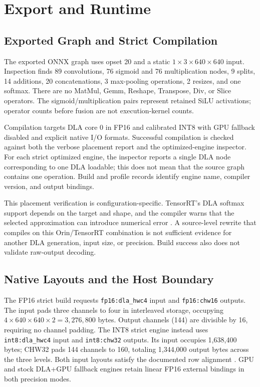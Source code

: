 \section{Export and Runtime}
\label{sec:deployment}
\subsection{Exported Graph and Strict Compilation}
The exported ONNX graph uses opset 20 and a static $1\times3\times640\times640$
input. Inspection finds 89 convolutions, 76 sigmoid and 76 multiplication nodes,
9 splits, 14 additions, 20 concatenations, 3 max-pooling operations, 2 resizes,
and one softmax. There are no MatMul, Gemm, Reshape, Transpose, Div, or Slice
operators. The sigmoid/multiplication pairs represent retained SiLU activations;
operator counts before fusion are not execution-kernel counts.

Compilation targets DLA core 0 in FP16 and calibrated INT8 with GPU fallback
disabled and explicit native I/O formats. Successful compilation is checked against both the verbose
placement report and the optimized-engine inspector. For each strict optimized engine,
the inspector reports a single DLA node corresponding to one DLA loadable; this
does not mean that the source graph contains one operation. Build and profile
records identify engine name, compiler version, and output bindings.

This placement verification is configuration-specific. TensorRT's DLA softmax support depends on
the target and shape, and the compiler warns that the selected approximation
can introduce numerical error \cite{nvidia_dla_working}. A source-level
rewrite that compiles on this Orin/TensorRT combination is not sufficient
evidence for another DLA generation, input size, or precision. Build success
also does not validate raw-output decoding.

\subsection{Native Layouts and the Host Boundary}
\label{sec:packing}
The FP16 strict build requests \texttt{fp16:dla\_hwc4} input and
\texttt{fp16:chw16} outputs. The input pads three channels to four in
interleaved storage, occupying $4\times640\times640\times2=3{,}276{,}800$
bytes. Output channels (144) are divisible by 16, requiring no channel padding.
The INT8 strict engine instead uses \texttt{int8:dla\_hwc4} input and
\texttt{int8:chw32} outputs. Its input occupies 1,638,400 bytes; CHW32 pads
144 channels to 160, totaling 1,344,000 output bytes across the three levels.
Both input layouts satisfy the documented row alignment
\cite{nvidia_dla_working}. GPU and stock DLA+GPU fallback engines retain linear FP16
external bindings in both precision modes.


